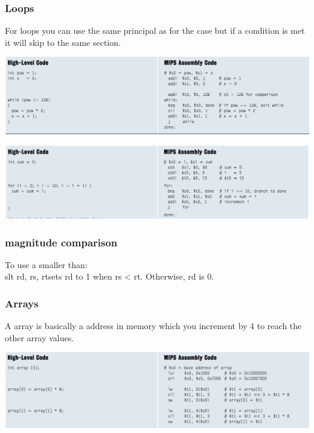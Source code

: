 		\subsubsection{Loops}
		For loops you can use the same principal as for the case but if a condition is met it will skip to the same section.
		\begin{center}
				\includegraphics[width = 18cm]{images/while}
		\end{center}
		\begin{center}
				\includegraphics[width = 18cm]{images/for}
		\end{center}
		\subsubsection{magnitude comparison}
		To use a smaller than:\\
		slt rd, rs, rt\tab sets rd to 1 when rs < rt. Otherwise, rd is 0.
		\subsubsection{Arrays}
		A array is basically a address in memory which you increment by 4 to reach the other array values.
		\begin{center}
				\includegraphics[width = 18cm]{images/array}
		\end{center}
